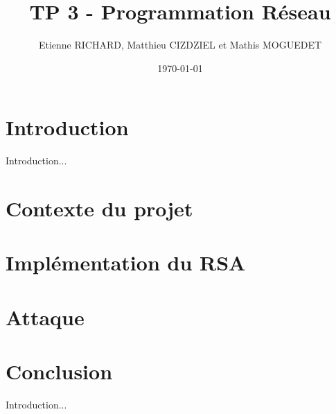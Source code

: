 \documentclass[12pt]{article}
\title{TP 3 - Programmation Réseau}	\let\Title\@title
\author{Etienne RICHARD, Matthieu CIZDZIEL et Mathis MOGUEDET} \let\Author\@author
\date{\today}           	\let\Date\@date
\begin{document}
\maketitle
\pagebreak

\tableofcontents
\pagebreak

\section*{Introduction}
Introduction...

\section{Contexte du projet}


\section{Implémentation du RSA}


\section{Attaque}


\section*{Conclusion}
Introduction...

\medskip
\printbibliography
\end{document}
